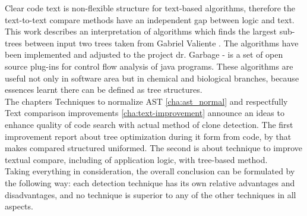 \documentclass{report}
\begin{document}
Clear code text is non-flexible structure for text-based algorithms, therefore the text-to-text compare methods have an independent gap between logic and text.
\\
This work describes an interpretation of algorithms which finds the largest sub-trees between input two trees taken from Gabriel Valiente \cite{valiente}. The algorithms have been implemented and adjusted to the project dr. Garbage - is a set of open source plug-ins for control flow analysis of java programs. These algorithms are useful not only in software area but in chemical and biological branches, because essences learnt there can be defined as tree structures.
\\
The chapters Techniques to normalize AST \ref{cha:ast_normal} and respectfully Text comparison improvements \ref{cha:text-improvement} announce an ideas to enhance quality of code search with actual method of clone detection. The first improvement report about tree optimization during it form from code, by that makes compared structured uniformed. The second is about technique to improve textual compare, including of application logic, with tree-based method.
\\
Taking everything in consideration, the overall conclusion can be formulated by the following way: each detection technique has its own relative advantages and disadvantages, and no technique is superior to any of the other techniques in all aspects.

\end{document}
